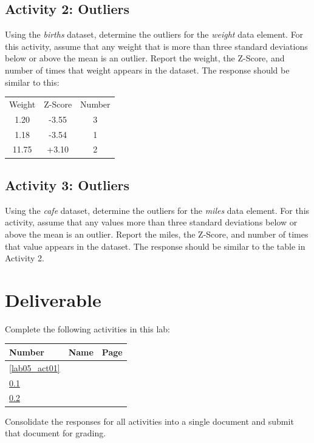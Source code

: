 \subsection{Activity 2: Outliers} \label{lab05_act02}

Using the \textit{births} dataset, determine the outliers for the \textit{weight} data element. For this activity, assume that any weight that is more than three standard deviations below or above the mean is an outlier. Report the weight, the Z-Score, and number of times that weight appears in the dataset. The response should be similar to this:

\begin{table}[H]
  \begin{center}
    \begin{tabular}{ccc} 
      Weight & Z-Score & Number \\
      1.20 & -3.55 & 3 \\
      1.18 & -3.54 & 1 \\
      11.75 & +3.10 & 2 
    \end{tabular}
  \end{center}
\end{table}

\subsection{Activity 3: Outliers} \label{lab05_act03}

Using the \textit{cafe} dataset, determine the outliers for the \textit{miles} data element. For this activity, assume that any values more than three standard deviations below or above the mean is an outlier. Report the miles, the Z-Score, and number of times that value appears in the dataset. The response should be similar to the table in Activity 2.

\section{Deliverable}

Complete the following activities in this lab:

\begin{center}
  \begin{tabular}{lll}
    \hline 
    \textbf{Number} & \textbf{Name} & \textbf{Page} \\ 
    \hline 
    \ref{lab05_act01} & \nameref{lab05_act01} & \pageref{lab05_act01} \\ 
    \ref{lab05_act02} & \nameref{lab05_act02} & \pageref{lab05_act02} \\ 
    \ref{lab05_act03} & \nameref{lab05_act03} & \pageref{lab05_act03} \\ 
    \hline 
  \end{tabular} 
\end{center}

Consolidate the responses for all activities into a single document and submit that document for grading.
